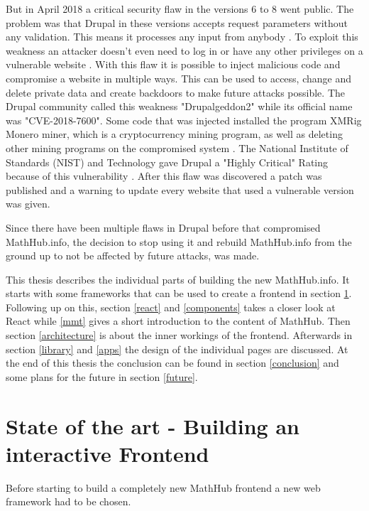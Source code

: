 \documentclass[11pt,a4paper]{article}
\begin{document}
But in April 2018 a critical security flaw in the versions 6 to 8 went public.
The problem was that Drupal in these versions accepts request parameters without any validation.
This means it processes any input from anybody \cite{zdnet}.
To exploit this weakness an attacker doesn't even need to log in or have any other privileges on a vulnerable website \cite{register}.
With this flaw it is possible to inject malicious code and compromise a website in multiple ways.
This can be used to access, change and delete private data and create backdoors to make future attacks possible.
The Drupal community called this weakness "Drupalgeddon2" while its official name was "CVE-2018-7600".
Some code that was injected installed the program XMRig Monero miner, which is a cryptocurrency mining program, as well as deleting other mining programs on the compromised system \cite{hacker}.
The National Institute of Standards (NIST) and Technology gave Drupal a "Highly Critical" Rating because of this vulnerability \cite{nist}.
 After this flaw was discovered a patch was published and a warning to update every website that used a vulnerable version was given.
	
Since there have been multiple flaws in Drupal before that compromised MathHub.info, the decision to stop using it and rebuild MathHub.info from the ground up to not be affected by future attacks, was made. 

\vspace{4cm} \noindent
This thesis describes the individual parts of building the new MathHub.info.
It starts with some frameworks that can be used to create a frontend in section \ref{SoA}.
Following up on this, section \ref{react} and \ref{components} takes a closer look at React while \ref{mmt} gives a short introduction to the content of MathHub.
Then section \ref{architecture} is about the inner workings of the frontend.
Afterwards in section \ref{library} and \ref{apps} the design of the individual pages are discussed.
At the end of this thesis the conclusion can be found in section \ref{conclusion} and some plans for the future in section \ref{future}.

\section{State of the art - Building an interactive Frontend} \label{SoA}
Before starting to build a completely new MathHub frontend a new web framework had to be chosen.
\end{document}
